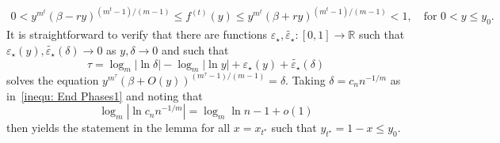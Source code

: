 \documentclass[11pt]{article}
\numberwithin{theorem}{section}
\begin{document}
\begin{align*}
\label{inequ: End Phases2} 
    0
    <
    y^{m^t}(\beta -ry)^{(m^t-1)/(m-1)} 
    \leq
    f^{(t)}(y) \leq y^{m^t}(\beta +ry)^{(m^t-1)/(m-1)}
    <
    1,
    \quad \text{for } 0 <y \leq y_0.
\end{align*}
It is straightforward to verify that there are functions $\varepsilon_\star, \widetilde{\varepsilon_\star}:[0,1]\to\mathbb{R}$ such that $\varepsilon_\star(y), \widetilde{\varepsilon_\star}(\delta)\to 0$ as $y,\delta\to 0$ and such that
\[
    \tau = \log_m|\ln\delta|-\log_m|\ln y| + \varepsilon_\star(y)+ \widetilde{\varepsilon_\star}(\delta)
\]
solves the equation $y^{m^\tau}(\beta + O(y))^{(m^\tau-1)/(m-1)} = \delta$. Taking $\delta = c_n n^{-1/m}$ as in~\eqref{inequ: End Phases1} and noting that 
\[
    \log_m|\ln c_n n^{-1/m}| = \log_m \ln n - 1 + o(1)
\]
then yields the statement in the lemma for all $x = x_{t^\star}$ such that $y_{t^\star} = 1 - x \le y_0$.
\end{document}
